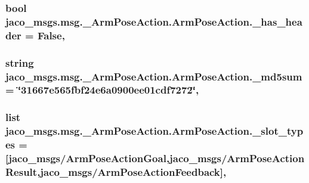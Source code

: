 \subsubsection[{\texorpdfstring{\+\_\+has\+\_\+header}{_has_header}}]{\setlength{\rightskip}{0pt plus 5cm}bool jaco\+\_\+msgs.\+msg.\+\_\+\+Arm\+Pose\+Action.\+Arm\+Pose\+Action.\+\_\+has\+\_\+header = False\hspace{0.3cm}{\ttfamily [static]}, {\ttfamily [private]}}\hypertarget{classjaco__msgs_1_1msg_1_1__ArmPoseAction_1_1ArmPoseAction_a55f6889a5be10bdf4116282783bdaf60}{}\label{classjaco__msgs_1_1msg_1_1__ArmPoseAction_1_1ArmPoseAction_a55f6889a5be10bdf4116282783bdaf60}
\subsubsection[{\texorpdfstring{\+\_\+md5sum}{_md5sum}}]{\setlength{\rightskip}{0pt plus 5cm}string jaco\+\_\+msgs.\+msg.\+\_\+\+Arm\+Pose\+Action.\+Arm\+Pose\+Action.\+\_\+md5sum = \char`\"{}31667e565fbf24e6a0900ee01cdf7272\char`\"{}\hspace{0.3cm}{\ttfamily [static]}, {\ttfamily [private]}}\hypertarget{classjaco__msgs_1_1msg_1_1__ArmPoseAction_1_1ArmPoseAction_a8940e31e74f95f0132f4956a4d563b0d}{}\label{classjaco__msgs_1_1msg_1_1__ArmPoseAction_1_1ArmPoseAction_a8940e31e74f95f0132f4956a4d563b0d}
\subsubsection[{\texorpdfstring{\+\_\+slot\+\_\+types}{_slot_types}}]{\setlength{\rightskip}{0pt plus 5cm}list jaco\+\_\+msgs.\+msg.\+\_\+\+Arm\+Pose\+Action.\+Arm\+Pose\+Action.\+\_\+slot\+\_\+types = \mbox{[}\textquotesingle{}jaco\+\_\+msgs/{\bf Arm\+Pose\+Action\+Goal}\textquotesingle{},\textquotesingle{}jaco\+\_\+msgs/{\bf Arm\+Pose\+Action\+Result}\textquotesingle{},\textquotesingle{}jaco\+\_\+msgs/{\bf Arm\+Pose\+Action\+Feedback}\textquotesingle{}\mbox{]}\hspace{0.3cm}{\ttfamily [static]}, {\ttfamily [private]}}\hypertarget{classjaco__msgs_1_1msg_1_1__ArmPoseAction_1_1ArmPoseAction_afa6ebc65498cb429b5abf5561c7889b5}{}\label{classjaco__msgs_1_1msg_1_1__ArmPoseAction_1_1ArmPoseAction_afa6ebc65498cb429b5abf5561c7889b5}


